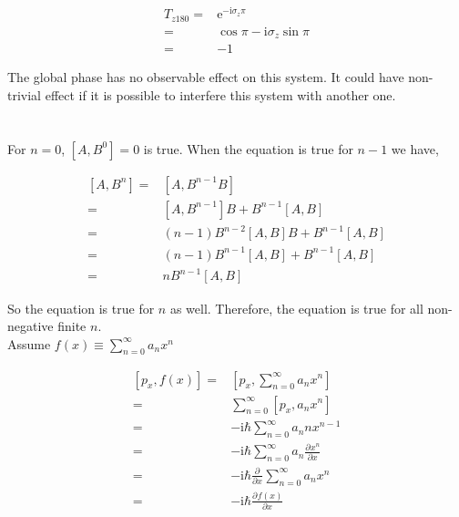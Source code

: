 \documentclass[10pt,fleqn]{article}
\newcommand{\ue}{\mathrm{e}}
\newcommand{\ui}{\mathrm{i}}
\newcommand{\dsum}{\displaystyle\sum}
\newcommand{\eqar}[1]
{
  \begin{align*}
    #1
  \end{align*}
}
\newcommand{\paren}[1]{{\left({#1}\right)}}
\newcommand{\sqr}[1]{{\left[{#1}\right]}}
\newcommand{\pdiff}[3][{}]{{\frac{\partial^{#1} {#2}}{\partial {#3}{}^{#1}}}}
\begin{document}
\subsection{}
\eqar{
  T_{z180}=&\ue^{-\ui\sigma_z\pi}\\
  =&\cos\pi-\ui\sigma_z\sin\pi\\
  =&-1
}
The global phase has no observable effect on this system.
It could have non-trivial effect if it is possible to interfere this system
with another one.
\section{}
\subsection{}
For $n=0$, $\sqr{A, B^0}=0$ is true.
When the equation is true for $n-1$ we have,
\eqar{
  \sqr{A, B^n}=&\sqr{A, B^{n-1}B}\\
  =&\sqr{A, B^{n-1}}B+B^{n-1}\sqr{A, B}\\
  =&\paren{n-1}B^{n-2}\sqr{A, B}B+B^{n-1}\sqr{A, B}\\
  =&\paren{n-1}B^{n-1}\sqr{A, B}+B^{n-1}\sqr{A, B}\\
  =&nB^{n-1}\sqr{A, B}
}
So the equation is true for $n$ as well. Therefore, the equation is true for all non-negative finite $n$.\\

Assume $f(x)\equiv\dsum_{n=0}^\infty a_nx^n$
\eqar{
  \sqr{p_x, f(x)}=&\sqr{p_x, \dsum_{n=0}^\infty a_nx^n}\\
  =&\dsum_{n=0}^\infty \sqr{p_x, a_nx^n}\\
  =&-\ui\hbar\dsum_{n=0}^\infty a_nnx^{n-1}\\
  =&-\ui\hbar\dsum_{n=0}^\infty a_n\pdiff{x^n}{x}\\
  =&-\ui\hbar\pdiff{}{x}\dsum_{n=0}^\infty a_nx^n\\
  =&-\ui\hbar\pdiff{f(x)}{x}
}
\subsection{}
\subsection{}
\end{document}
